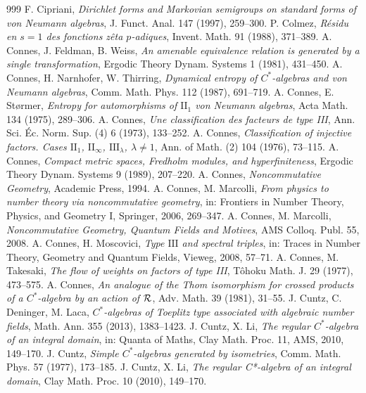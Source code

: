 \begin{thebibliography}{999}
 F. Cipriani, \emph{Dirichlet forms and Markovian semigroups on standard forms of von Neumann algebras}, J. Funct. Anal. 147 (1997), 259--300.
 P. Colmez, \emph{R\'esidu en $s=1$ des fonctions z\^eta $p$-adiques}, Invent. Math. 91 (1988), 371--389.
 A. Connes, J. Feldman, B. Weiss, \emph{An amenable equivalence relation is generated by a single transformation}, Ergodic Theory Dynam. Systems 1 (1981), 431--450.
 A. Connes, H. Narnhofer, W. Thirring, \emph{Dynamical entropy of $C^*$-algebras and von Neumann algebras}, Comm. Math. Phys. 112 (1987), 691--719.
 A. Connes, E. St\o rmer, \emph{Entropy for automorphisms of $\mathrm{II}_1$ von Neumann algebras}, Acta Math. 134 (1975), 289--306.
 A. Connes, \emph{Une classification des facteurs de type III}, Ann. Sci. \'Ec. Norm. Sup. (4) 6 (1973), 133--252.
 A. Connes, \emph{Classification of injective factors. Cases $\mathrm{II}_1$, $\mathrm{II}_\infty$, $\mathrm{III}_\lambda$, $\lambda\ne1$}, Ann. of Math. (2) 104 (1976), 73--115.
 A. Connes, \emph{Compact metric spaces, Fredholm modules, and hyperfiniteness}, Ergodic Theory Dynam. Systems 9 (1989), 207--220.
 A. Connes, \emph{Noncommutative Geometry}, Academic Press, 1994.
 A. Connes, M. Marcolli, \emph{From physics to number theory via noncommutative geometry}, in: Frontiers in Number Theory, Physics, and Geometry I, Springer, 2006, 269--347.
 A. Connes, M. Marcolli, \emph{Noncommutative Geometry, Quantum Fields and Motives}, AMS Colloq. Publ. 55, 2008.
 A. Connes, H. Moscovici, \emph{Type $\mathrm{III}$ and spectral triples}, in: Traces in Number Theory, Geometry and Quantum Fields, Vieweg, 2008, 57--71.
 A. Connes, M. Takesaki, \emph{The flow of weights on factors of type III}, T\^ohoku Math. J. 29 (1977), 473--575.
 A. Connes, \emph{An analogue of the Thom isomorphism for crossed products of a $C^*$-algebra by an action of $\mathcal{R}$}, Adv. Math. 39 (1981), 31--55.
 J. Cuntz, C. Deninger, M. Laca, \emph{$C^*$-algebras of Toeplitz type associated with algebraic number fields}, Math. Ann. 355 (2013), 1383--1423.
 J. Cuntz, X. Li, \emph{The regular $C^*$-algebra of an integral domain}, in: Quanta of Maths, Clay Math. Proc. 11, AMS, 2010, 149--170.
 J. Cuntz, \emph{Simple $C^*$-algebras generated by isometries}, Comm. Math. Phys. 57 (1977), 173--185.
 J. Cuntz, X. Li, \emph{The regular C*-algebra of an integral domain}, Clay Math. Proc. 10 (2010), 149--170.

\end{thebibliography}
